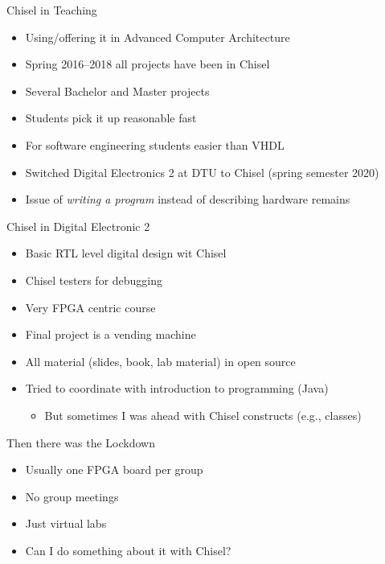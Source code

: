 \begin{frame}[fragile]{Chisel in Teaching}
\begin{itemize}
\item Using/offering it in Advanced Computer Architecture
\item Spring 2016--2018 all projects have been in Chisel
\item Several Bachelor and Master projects
\item Students pick it up reasonable fast
\item For software engineering students easier than VHDL
\item Switched Digital Electronics 2 at DTU to Chisel (spring semester 2020)
\item Issue of \emph{writing a program} instead of describing hardware remains
\end{itemize}
\end{frame}

\begin{frame}[fragile]{Chisel in Digital Electronic 2}
\begin{itemize}
\item Basic RTL level digital design wit Chisel
\item Chisel testers for debugging
\item Very FPGA centric course
\item Final project is a vending machine
\item All material (slides, book, lab material) in open source
\item Tried to coordinate with introduction to programming (Java)
\begin{itemize}
\item But sometimes I was ahead with Chisel constructs (e.g., classes)
\end{itemize}
\end{itemize}
\end{frame}

\begin{frame}[fragile]{Then there was the Lockdown}
\begin{itemize}
\item Usually one FPGA board per group
\item No group meetings
\item Just virtual labs
\item Can I do something about it with Chisel?
\end{itemize}
\end{frame}

